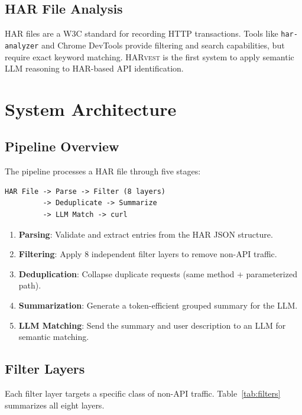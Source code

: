 \documentclass[10pt,twocolumn]{article}
\begin{document}
\subsection{HAR File Analysis}

HAR files are a W3C standard for recording HTTP transactions. Tools like \texttt{har-analyzer} and Chrome DevTools provide filtering and search capabilities, but require exact keyword matching. \textsc{HARvest} is the first system to apply semantic LLM reasoning to HAR-based API identification.

\section{System Architecture}

\subsection{Pipeline Overview}

The pipeline processes a HAR file through five stages:

\begin{lstlisting}
HAR File -> Parse -> Filter (8 layers)
         -> Deduplicate -> Summarize
         -> LLM Match -> curl
\end{lstlisting}

\begin{enumerate}[nosep]
  \item \textbf{Parsing}: Validate and extract entries from the HAR JSON structure.
  \item \textbf{Filtering}: Apply 8 independent filter layers to remove non-API traffic.
  \item \textbf{Deduplication}: Collapse duplicate requests (same method + parameterized path).
  \item \textbf{Summarization}: Generate a token-efficient grouped summary for the LLM.
  \item \textbf{LLM Matching}: Send the summary and user description to an LLM for semantic matching.
\end{enumerate}

\subsection{Filter Layers}

Each filter layer targets a specific class of non-API traffic. Table~\ref{tab:filters} summarizes all eight layers.
\end{document}
